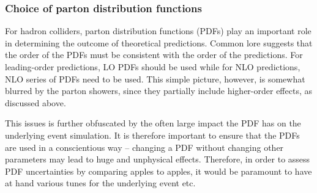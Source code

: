 \subsubsection{Choice of parton distribution functions}
For hadron colliders, parton distribution functions (PDFs) play an important 
role in determining the outcome of theoretical predictions.  Common lore
suggests that the order of the PDFs must be consistent with the order of the 
predictions.  For leading-order predictions, LO PDFs should be used while 
for NLO predictions, NLO series of PDFs need to be used.  This simple picture,
however, is somewhat blurred by the parton showers, since they partially 
include higher-order effects, as discussed above.  


This issues is further obfuscated by the often large impact the PDF has on 
the underlying event simulation.  It is therefore important to ensure that
the PDFs are used in a conscientious way -- changing a PDF without changing 
other parameters may lead to huge and unphysical effects.  Therefore, in 
order to assess PDF uncertainties by comparing apples to apples, it would be 
paramount to have at hand various tunes for the underlying event etc.


